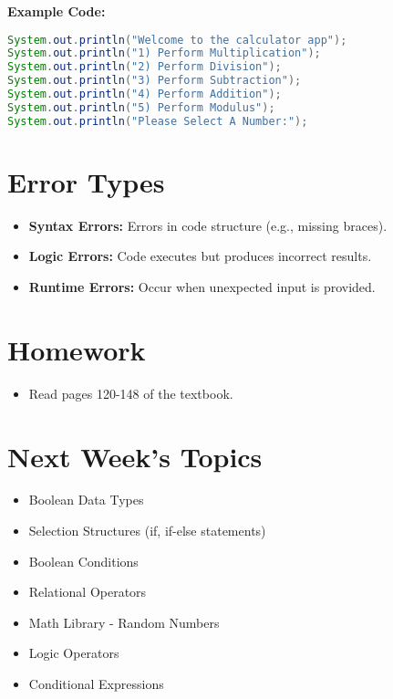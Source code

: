 \documentclass{article}
\begin{document}
\textbf{Example Code:}
\begin{lstlisting}[language=Java]
System.out.println("Welcome to the calculator app");
System.out.println("1) Perform Multiplication");
System.out.println("2) Perform Division");
System.out.println("3) Perform Subtraction");
System.out.println("4) Perform Addition");
System.out.println("5) Perform Modulus");
System.out.println("Please Select A Number:");
\end{lstlisting}

\section{Error Types}
\begin{itemize}
    \item \textbf{Syntax Errors:} Errors in code structure (e.g., missing braces).
    \item \textbf{Logic Errors:} Code executes but produces incorrect results.
    \item \textbf{Runtime Errors:} Occur when unexpected input is provided.
\end{itemize}

\section{Homework}
\begin{itemize}
    \item Read pages 120-148 of the textbook.
\end{itemize}

\section{Next Week's Topics}
\begin{itemize}
    \item Boolean Data Types
    \item Selection Structures (if, if-else statements)
    \item Boolean Conditions
    \item Relational Operators
    \item Math Library - Random Numbers
    \item Logic Operators
    \item Conditional Expressions
\end{itemize}
\end{document}
